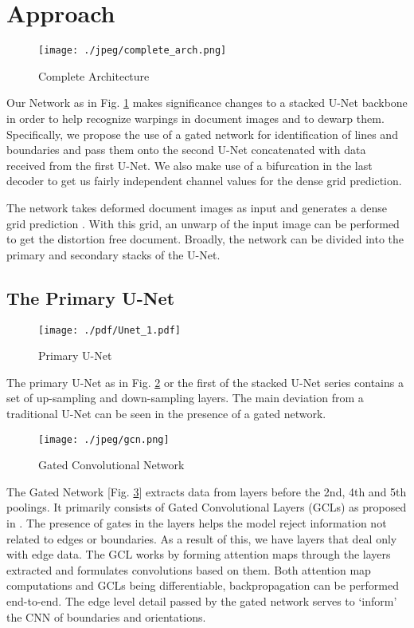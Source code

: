\documentclass[a4paper,conference]{IEEEtran}
\begin{document}
	\section{Approach}
	
	\begin{figure}
		\centering
		{	
			\texttt{[image: ./jpeg/complete\_arch.png]}
		}
		\caption{Complete Architecture}
		\label{fig:arch}
	\end{figure}
	
	Our Network as in Fig. \ref{fig:arch} makes significance changes to a stacked U-Net backbone in order to help recognize warpings in document images and to dewarp them. Specifically,  we propose the use of a gated network for identification of lines and boundaries and pass them onto the second U-Net concatenated with data received from the first U-Net. We also make use of a bifurcation in the last decoder to get us fairly independent channel values for the dense grid prediction.
	
	
	The network takes deformed document images as input  and generates a dense grid prediction . With this grid, an unwarp of the input image can be performed to get the distortion free document. Broadly, the network can be divided into the primary and secondary stacks of the U-Net.
	
	\subsection{The Primary U-Net}
	
	\begin{figure}[!t]
		\texttt{[image: ./pdf/Unet\_1.pdf]}
		\caption{Primary U-Net}
		
		\label{fig:arch1}
	\end{figure}
	
	The primary U-Net as in Fig. \ref{fig:arch1} or the first of the stacked U-Net series contains a set of up-sampling and down-sampling layers. The main deviation from a traditional U-Net can be seen in the presence of a gated network.
	\\
	
	
	\begin{figure}
		\centering
		{	
			\texttt{[image: ./jpeg/gcn.png]}
		}
		\caption{Gated Convolutional Network}
		\label{fig:arch3}
	\end{figure}
	The Gated Network [Fig. \ref{fig:arch3}] extracts data from layers before the 2nd, 4th and 5th poolings. It primarily consists of Gated Convolutional Layers (GCLs) as proposed in \cite{GSCNN}. The presence of gates in the layers helps the model reject information not related to edges or boundaries. As a result of this, we have layers that deal only with edge data. The GCL works by forming attention maps through the layers extracted and formulates convolutions based on them. Both attention map computations and GCLs being differentiable, backpropagation can be performed end-to-end.
	The edge level detail passed by the gated network serves to `inform' the CNN of boundaries and orientations.
	
\end{document}
